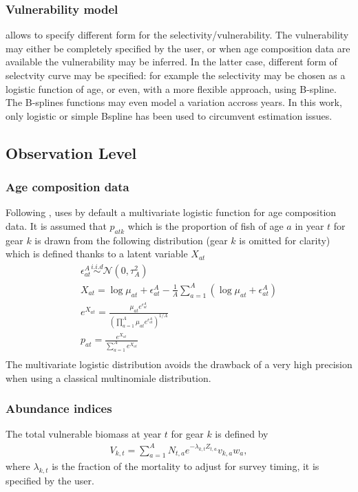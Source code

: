 \subsubsection{Vulnerability model}
\label{sec:vulnerability}
\iscam    allows     to    specify    different    form     for    the
selectivity/vulnerability. The vulnerability  may either be completely
specified by the user, or when  age composition data are available the
vulnerability may be  inferred. In the latter case,  different form of
selectvity curve may be specified:  for example the selectivity may be
chosen as a logistic function of age, or even, with a more flexible approach, using B-spline.  The B-splines
functions may  even model a  variation accross years. In  this work,
only logistic or simple Bspline has been used to circumvent estimation issues.


\subsection{Observation Level}
\subsubsection{Age composition data}

Following  \cite{Schnute+95}, \iscam  uses by  default a  multivariate
logistic  function  for  age  composition data.  It  is  assumed  that
$p_{atk}$ which is the  proportion of fish of age $a$  in year $t$ for
gear $k$ is drawn from the following distribution (gear $k$ is omitted
for clarity) which is defined thanks to a latent variable $X_{at}$
\begin{gather}
\epsilon^{A}_{at} \overset{i.i.d}{\sim} \mathcal{N}(0,\tau^2_A)\nonumber \\ 
X_{at}       =       \log{\mu_{at}}       +       \epsilon_{at}^A       -
\frac{1}{A}\sum_{a=1}^A\left(\log{\mu_{at}} + \epsilon_{at}^A \right) \nonumber \\
e^{X_{at}} = \frac{\mu_{at}e^{\epsilon_{at}^A}}{ \left(\prod_{a=1}^A \mu_{at}e^{\epsilon_{at}^A}\right) ^{1/A}}\nonumber\\
p_{at} = \frac{e^{X_{at}} } {\sum_{a=1}^A e^{X_{at}} }\\
\end{gather}
The multivariate logistic distribution  avoids the drawback of a very high
precision when using a classical multinomiale distribution.

\subsubsection{Abundance indices}
The total vulnerable biomass at year $t$ for gear $k$ is defined by
\begin{gather}
V_{k,t}=\sum_{a=1}^A N_{t,a} e^{-\lambda_{k,t} Z_{t,a}} v_{k,a} w_a,
\end{gather}
 where $\lambda_{k,t}$ is the fraction  of the mortality to adjust for
 survey timing, it is specified by the user.

